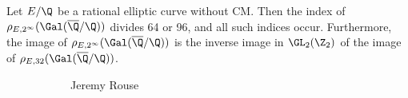 \begin{frame}[plain]
\begin{thm}
Let $E/\Q$ be a rational elliptic curve without CM. Then the index of $\rho_{E,2^\infty}(\Gal(\overline{\Q}/\Q))$ divides 64 or 96, and all such indices occur. Furthermore, the image of $\rho_{E,2^\infty}(\Gal(\overline{\Q}/\Q))$ is the inverse image in $\GL_2(\Z_2)$ of the image of $\rho_{E,32}(\Gal(\overline{\Q}/\Q))$.
\end{thm}
	\begin{figure}[h]
	\centering
	\begin{subfigure}{0.3\textwidth}
	\captionsetup{labelformat=empty}
	\centering
	\caption{Jeremy Rouse}
	\end{subfigure}
	\begin{subfigure}{0.3\textwidth}
	\captionsetup{labelformat=empty}
	\centering

\end{subfigure}
\end{figure}
\end{frame}
